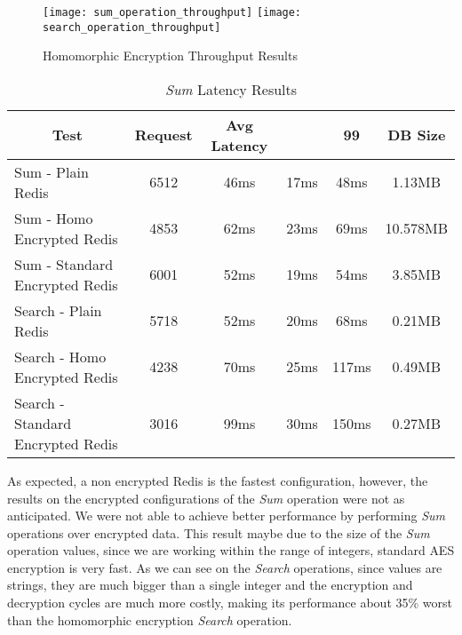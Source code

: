 \begin{figure}[htbp]
  \centering
    {\texttt{[image: sum\_operation\_throughput]}}%
    {\texttt{[image: search\_operation\_throughput]}}%
  \caption{Homomorphic Encryption Throughput Results}
  \label{fig:homomorphic_encryption_throughput_results}
\end{figure}

\begin{table}[ht]
	\caption{\textit{Sum} Latency Results}
	\label{tab:sum_latency_results}
\centering
\begin{tabular}{lccccc}
	\toprule
	\multicolumn{1}{c}{\textbf{Test}} & \pmb{\#}\textbf{Request} & \textbf{Avg Latency} & \pmb{\ensuremath{\sigma}} & \textbf{99}\pmb{\%} & \textbf{DB Size} \\
	\midrule
		Sum - Plain Redis & 6512 & 46ms & 17ms & 48ms & 1.13MB  					\\
		Sum - Homo Encrypted Redis & 4853 & 62ms & 23ms & 69ms & 10.578MB  		\\
		Sum - Standard Encrypted Redis & 6001 & 52ms & 19ms & 54ms & 3.85MB  	\\
		Search - Plain Redis & 5718 & 52ms & 20ms & 68ms & 0.21MB				\\
		Search - Homo Encrypted Redis & 4238	 & 70ms & 25ms & 117ms & 0.49MB		\\
		Search - Standard Encrypted Redis & 3016	 & 99ms & 30ms & 150ms & 0.27MB	\\
	\bottomrule
\end{tabular}
\end{table}

As expected, a non encrypted Redis is the fastest configuration, however, the results on the encrypted configurations of the \textit{Sum} operation were not as anticipated. We were not able to achieve better performance by performing \textit{Sum} operations over encrypted data. This result maybe due to the size of the \textit{Sum} operation values, since we are working within the range of integers, standard \gls{AES} encryption is very fast. As we can see on the \textit{Search} operations, since values are strings, they are much bigger than a single integer and the encryption and decryption cycles are much more costly, making its performance about 35\% worst than the homomorphic encryption \textit{Search} operation.

